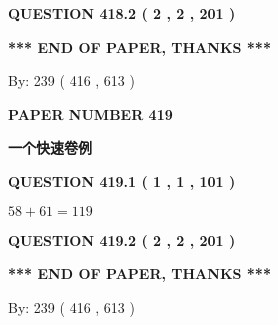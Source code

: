 \documentclass{ctexart}
\begin{document}
{\textbf{\Large{QUESTION
418.2 
 ( 2 , 2 , 201 )
}}}
  
  
   
   
 \vspace{0.2in}
 
   
   
   
   
\vspace{1.0in} 
{\textbf{\large{ *** END OF PAPER, THANKS *** }}} 
   
   
\hspace{1.0in} By: 
 239 ( 416 ,  613 )
   
   
   
   
\newpage 
\setcounter{page}{ 
   419001 } 
   
   
   
   
 {\textbf{ \Large{ PAPER NUMBER  419  }}}
   
   
\vspace{0.2in}
   
   
   
   
   
   
 \vspace{0.2in}
{\LARGE {\textbf{ 一个快速卷例}}}
   
   
  
\vspace{0.2in}
  
{\textbf{\Large{QUESTION
419.1 
 ( 1 , 1 , 101 )
}}}
  
  
 
 

$ %
58 +  %
61=   %
119$
 
 
  
\vspace{0.2in}
  
{\textbf{\Large{QUESTION
419.2 
 ( 2 , 2 , 201 )
}}}
  
  
   
   
 \vspace{0.2in}
 
   
   
   
   
\vspace{1.0in} 
{\textbf{\large{ *** END OF PAPER, THANKS *** }}} 
   
   
\hspace{1.0in} By: 
 239 ( 416 ,  613 )
   
   
   
   
\newpage 
\setcounter{page}{ 
   420001 } 
   
\end{document}
